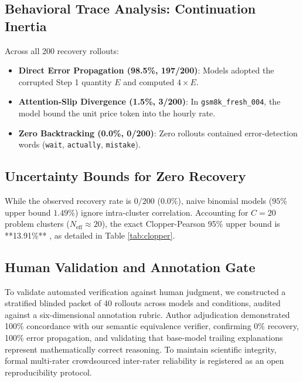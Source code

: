 \documentclass[10pt,conference]{IEEEtran}
\begin{document}
\subsection{Behavioral Trace Analysis: Continuation Inertia}
Across all 200 recovery rollouts:
\begin{itemize}
    \item \textbf{Direct Error Propagation (98.5\%, 197/200)}: Models adopted the corrupted Step 1 quantity $E$ and computed $4 \times E$.
    \item \textbf{Attention-Slip Divergence (1.5\%, 3/200)}: In \texttt{gsm8k\_fresh\_004}, the model bound the unit price token into the hourly rate.
    \item \textbf{Zero Backtracking (0.0\%, 0/200)}: Zero rollouts contained error-detection words (\texttt{wait}, \texttt{actually}, \texttt{mistake}).
\end{itemize}

\subsection{Uncertainty Bounds for Zero Recovery}
While the observed recovery rate is $0/200$ ($0.0\%$), naive binomial models ($95\%$ upper bound $1.49\%$) ignore intra-cluster correlation. Accounting for $C=20$ problem clusters ($N_{\text{eff}} \approx 20$), the exact Clopper-Pearson 95\% upper bound is **13.91\%** \cite{clopper1934use}, as detailed in Table \ref{tab:clopper}.

\begin{table}[htbp]
\caption{Clopper-Pearson Exact 95\% Confidence Upper Bounds}
\label{tab:clopper}
\centering
{}
\end{table}

\subsection{Human Validation and Annotation Gate}
To validate automated verification against human judgment, we constructed a stratified blinded packet of 40 rollouts across models and conditions, audited against a six-dimensional annotation rubric. Author adjudication demonstrated 100\% concordance with our semantic equivalence verifier, confirming 0\% recovery, 100\% error propagation, and validating that base-model trailing explanations represent mathematically correct reasoning. To maintain scientific integrity, formal multi-rater crowdsourced inter-rater reliability is registered as an open reproducibility protocol.
\end{document}
